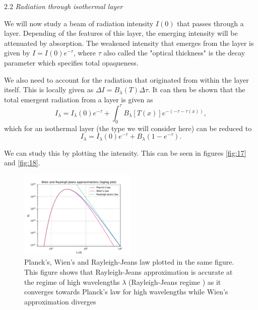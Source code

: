 \documentclass[a4paper,11.5pt,]{article}
\begin{document}
\begin{multicols}{2}
\begin{center}
2.2\textit{ Radiation through isothermal layer}
\end{center}
We will now study a beam of radiation intensity $I(0)$ that passes through a layer. Depending of the features of this layer, the emerging intensity will be attenuated by absorption. The weakened intensity that emerges from the layer is given by $I = I(0) e^{- \tau}$, where $\tau$ also called the "optical thickness" is the decay parameter which specifies total opaqueness. 

We also need to account for the radiation that originated from within the layer itself. This is locally given as $\Delta I = B_\lambda(T) \Delta \tau$.
It can then be shown that the total emergent radiation from a layer is given as
\begin{equation}
    I_\lambda = I_\lambda(0) e^{-\tau} + \int_0^\tau B_\lambda [T(x)] e^{-(-\tau - \tau(x))},
\end{equation}
which for an isothermal layer (the type we will consider here) can be reduced to
\begin{equation}
    I_\lambda = I_\lambda(0) e^{-\tau} + B_\lambda (1- e^{-\tau}).
\end{equation}

We can study this by plotting the intensity. This can be seen in figures \ref{fig:17} and \ref{fig:18}.
\begin{figure}[H]
	\centering
	\includegraphics[width=0.5\textwidth]{SSA/figures/planckapproxlog.pdf}
	\caption{Planck's, Wien's and Rayleigh-Jeans law plotted in the same figure. This figure shows that Rayleigh-Jeans approximation is accurate at the regime of high wavelengths $\lambda$ (Rayleigh-Jeans regime ) as it converges towards Planck's law for high wavelengths while Wien's approximation diverges}
	\label{fig:16}
\end{figure}


\end{multicols}
\end{document}
